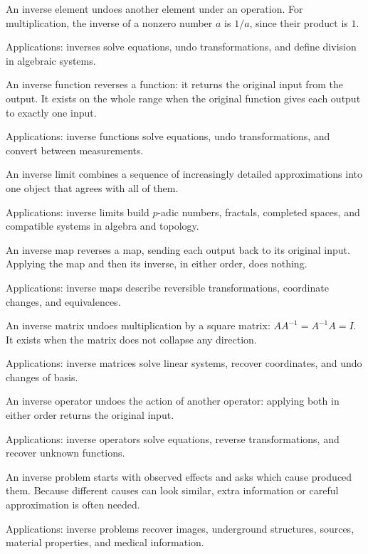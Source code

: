 An inverse element undoes another element under an operation. For multiplication, the inverse of a nonzero number $a$ is $1/a$, since their product is $1$. \par\noindent Applications: inverses solve equations, undo transformations, and define division in algebraic systems.

An inverse function reverses a function: it returns the original input from the output. It exists on the whole range when the original function gives each output to exactly one input. \par\noindent Applications: inverse functions solve equations, undo transformations, and convert between measurements.

An inverse limit combines a sequence of increasingly detailed approximations into one object that agrees with all of them. \par\noindent Applications: inverse limits build $p$-adic numbers, fractals, completed spaces, and compatible systems in algebra and topology.

An inverse map reverses a map, sending each output back to its original input. Applying the map and then its inverse, in either order, does nothing. \par\noindent Applications: inverse maps describe reversible transformations, coordinate changes, and equivalences.

An inverse matrix undoes multiplication by a square matrix: $AA^{-1}=A^{-1}A=I$. It exists when the matrix does not collapse any direction. \par\noindent Applications: inverse matrices solve linear systems, recover coordinates, and undo changes of basis.

An inverse operator undoes the action of another operator: applying both in either order returns the original input. \par\noindent Applications: inverse operators solve equations, reverse transformations, and recover unknown functions.

An inverse problem starts with observed effects and asks which cause produced them. Because different causes can look similar, extra information or careful approximation is often needed. \par\noindent Applications: inverse problems recover images, underground structures, sources, material properties, and medical information.

